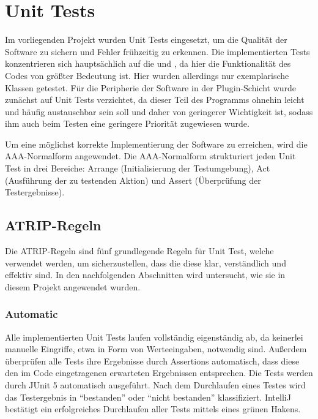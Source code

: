 \chapter{Unit Tests}

Im vorliegenden Projekt wurden Unit Tests eingesetzt, um die Qualität der Software zu sichern und Fehler frühzeitig zu erkennen. Die implementierten Tests konzentrieren sich hauptsächlich auf die \href{https://github.com/MichaelaHaag/RezeptApp/blob/main/3-Domain-Code/src/test/java/de/rezeptapp/domain/Rezept}{} und \href{https://github.com/MichaelaHaag/RezeptApp/tree/main/1-Adapter/src/test/java/de/rezeptapp/adapter/Datenpersistenz}{}, da hier die Funktionalität des Codes von größter Bedeutung ist. Hier wurden allerdings nur exemplarische Klassen getestet. Für die Peripherie der Software in der Plugin-Schicht wurde zunächst auf Unit Tests verzichtet, da dieser Teil des Programms ohnehin leicht und häufig austauschbar sein soll und daher von geringerer Wichtigkeit ist, sodass ihm auch beim Testen eine geringere Priorität zugewiesen wurde.

Um eine möglichst korrekte Implementierung der Software zu erreichen, wird die AAA-Normalform angewendet. Die AAA-Normalform strukturiert jeden Unit Test in drei Bereiche: Arrange (Initialisierung der Testumgebung), Act (Ausführung der zu testenden Aktion) und Assert (Überprüfung der Testergebnisse).

\section{ATRIP-Regeln}

Die ATRIP-Regeln sind fünf grundlegende Regeln für Unit Test, welche verwendet werden, um sicherzustellen, dass die diese klar, verständlich und effektiv sind. In den nachfolgenden Abschnitten wird untersucht, wie sie in diesem Projekt angewendet wurden.

\subsection{Automatic}

Alle implementierten Unit Tests laufen vollständig eigenständig ab, da keinerlei manuelle Eingriffe, etwa in Form von Werteeingaben, notwendig sind. Außerdem überprüfen alle Tests ihre Ergebnisse durch Assertions automatisch, dass diese den im Code eingetragenen erwarteten Ergebnissen entsprechen. Die Tests werden durch JUnit 5 automatisch ausgeführt. Nach dem Durchlaufen eines Testes wird das Testergebnis in \enquote{bestanden} oder \enquote{nicht bestanden} klassifiziert. IntelliJ bestätigt ein erfolgreiches Durchlaufen aller Tests mittels eines grünen Hakens.

